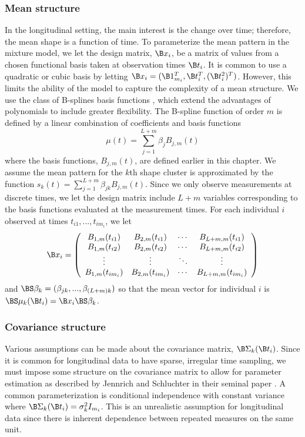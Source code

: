 \subsubsection{Mean structure}
In the longitudinal setting, the main interest is the change over time; therefore, the mean shape is a function of time. To parameterize the mean pattern in the mixture model, we let the design matrix, $\B x_{i}$, be a matrix of values from a chosen functional basis taken at observation times $\B t_{i}$. It is common to use a quadratic or cubic basis by letting $\B x_{i} = (\B 1_{m_{i}}^{T},\B t_{i}^{T}, (\B t^{2}_{i})^{T})$. However, this limits the ability of the model to capture the complexity of a mean structure. We use the class of B-splines basis functions \cite{deboor1978, schumaker1981,curry1966, de1976}, which extend the advantages of polynomials to include greater flexibility. The B-spline function of order $m$ is defined by a linear combination of coefficients and basis functions
$$\mu(t) = \sum^{L+m}_{j=1} \beta_j B_{j,m}(t)$$
where the basis functions, $B_{j,m}(t)$, are defined earlier in this chapter. We assume the mean pattern for the $k$th shape cluster is approximated by the function $s_{k}(t)=\sum^{L+m}_{j=1} \beta_{jk} B_{j,m}(t)$.  Since we only observe measurements at discrete times, we let the design matrix include $L+m$ variables corresponding to the basis functions evaluated at the measurement times.  For each individual $i$ observed at times $t_{i1},...,t_{im_{i}}$, we let $$\B x_{i} = \left(\begin{array}{cccc} 
B_{1,m}(t_{i1})&B_{2,m}(t_{i1})&\cdots&B_{L+m,m}(t_{i1})\\
B_{1,m}(t_{i2})&B_{2,m}(t_{i2})&\cdots&B_{L+m,m}(t_{i2})\\
\vdots&\vdots&\ddots&\vdots\\
B_{1,m}(t_{im_{i}})&B_{2,m}(t_{im_{i}})&\cdots&B_{L+m,m}(t_{im_{i}})\end{array}\right)$$
and $\BS\beta_{k} = (\beta_{jk},...,\beta_{(L+m) k})$ so that the mean vector for individual $i$ is $\BS\mu_{k}(\B t_{i}) = \B x_{i}\BS\beta_{k}$.

\subsubsection{Covariance structure}
Various assumptions can be made about the covariance matrix, $\B \Sigma_{k}(\B t_{i})$. Since it is common for longitudinal data to have sparse, irregular time sampling, we must impose some structure on the covariance matrix to allow for parameter estimation as described by Jennrich and Schluchter in their seminal paper \cite{jennrich1986}. A common parameterization is conditional independence with constant variance where $\B \Sigma_{k}(\B t_{i}) = \sigma_{k}^{2}I_{m_{i}}$. This is an unrealistic assumption for longitudinal data since there is inherent dependence between repeated measures on the same unit. 

